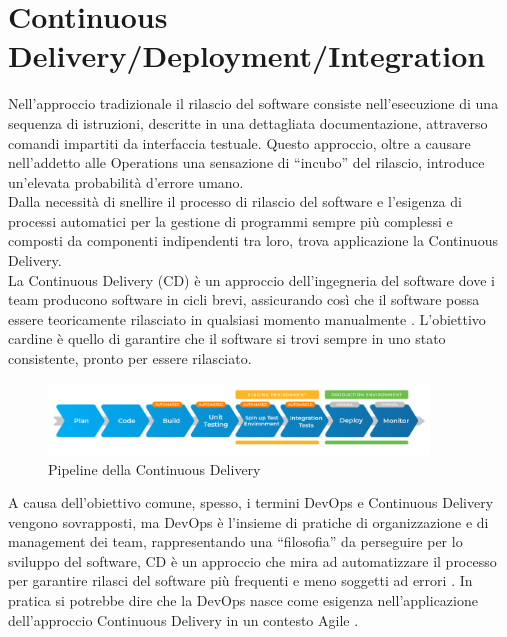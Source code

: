 \documentclass[a4paper, 12pt]{report}
\numberwithin{equation}{section}
\begin{document}
\section{Continuous Delivery/Deployment/Integration}
Nell'approccio tradizionale il rilascio del software consiste nell’esecuzione di una sequenza di istruzioni, descritte in una dettagliata documentazione, attraverso comandi impartiti da interfaccia testuale. Questo approccio, oltre a causare nell’addetto alle Operations una sensazione di “incubo” del rilascio, introduce un’elevata probabilità d’errore umano. \\
Dalla necessità di snellire il processo di rilascio del software e l’esigenza di processi automatici per la gestione di programmi sempre più complessi e composti da componenti indipendenti tra loro, trova applicazione la Continuous Delivery.\\ 
La Continuous Delivery (CD) è un approccio dell’ingegneria del software dove i team producono software in cicli brevi, assicurando così che il software possa essere teoricamente rilasciato in qualsiasi momento manualmente \cite{chen-devops}. L’obiettivo cardine è quello di garantire che il software si trovi sempre in uno stato consistente, pronto per essere rilasciato.\\
\begin{figure}
    \centering
    \includegraphics[width=0.9\textwidth]{imgs/cdci.png}
    \caption{Pipeline della Continuous Delivery}
    \label{fig:cd}
\end{figure}
A causa dell'obiettivo comune, spesso, i termini DevOps e Continuous Delivery vengono sovrapposti, ma DevOps è l’insieme di pratiche di organizzazione e di management dei team, rappresentando una “filosofia” da perseguire per lo sviluppo del software, CD è un approccio che mira ad automatizzare il processo per garantire rilasci del software più frequenti e meno soggetti ad errori \cite{humble-devops}. In pratica si potrebbe dire che la DevOps nasce come esigenza nell’applicazione dell’approccio Continuous Delivery in un contesto Agile \cite{lwakatare-devops}.\\
\end{document}
